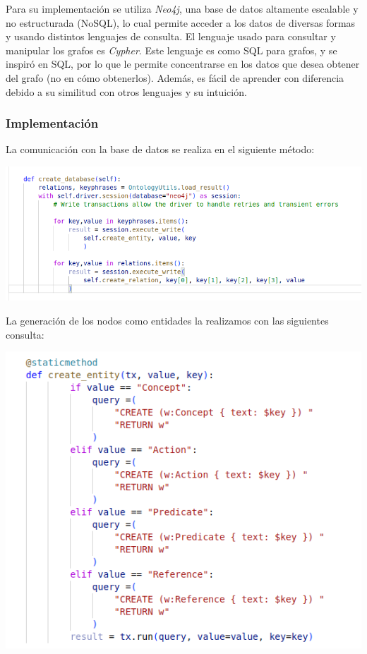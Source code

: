 \documentclass[10pt]{article} %
\begin{document}
	Para su implementaci\'on se utiliza \textit{Neo4j},  una base de datos altamente escalable y no estructurada (NoSQL), lo cual permite acceder a los datos de diversas formas y usando distintos lenguajes de consulta. El lenguaje usado para consultar y manipular los grafos es \textit{Cypher}. Este lenguaje es como SQL para grafos, y se inspiró en SQL, por lo que le permite concentrarse en los datos que desea obtener del grafo (no en cómo obtenerlos). Adem\'as, es fácil de aprender con diferencia debido a su similitud con otros lenguajes y su intuición.
	
	\subsubsection{Implementaci\'on}	

    La comunicación con la base de datos se realiza en el siguiente método:
    \begin{center}
    	\includegraphics[scale=0.5]{../images/createdatabase}
    \end{center}
	
	La generación de los nodos como entidades la realizamos con las siguientes consulta:
	
	 \begin{center}
		\includegraphics[scale=0.5]{../images/imageEntities}
	\end{center}
	
\end{document}
